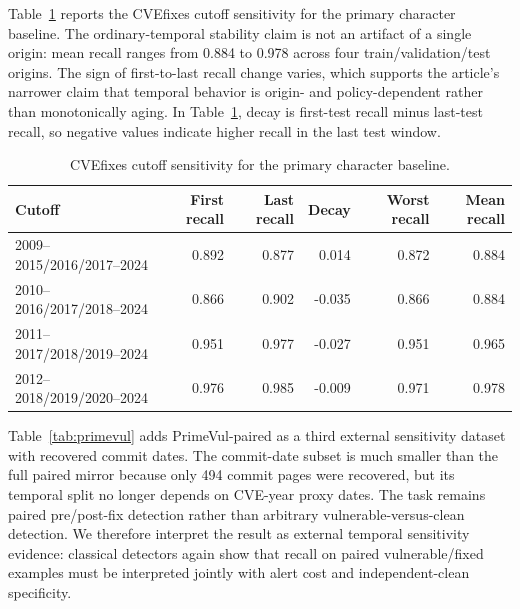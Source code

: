 \documentclass[a4paper,fleqn]{cas-dc}
\begin{document}
Table~\ref{tab:cutoff-sensitivity} reports the CVEfixes cutoff sensitivity for
the primary character baseline. The ordinary-temporal stability claim is not an
artifact of a single origin: mean recall ranges from 0.884 to 0.978 across four
train/validation/test origins. The sign of first-to-last recall change varies,
which supports the article's narrower claim that temporal behavior is origin- and
policy-dependent rather than monotonically aging. In Table~\ref{tab:cutoff-sensitivity},
decay is first-test recall minus last-test recall, so negative values indicate
higher recall in the last test window.

\begin{table}
\centering
\caption{CVEfixes cutoff sensitivity for the primary character baseline.}
\label{tab:cutoff-sensitivity}
\small
\setlength{\tabcolsep}{4pt}
\begin{tabular}{lrrrrr}
\toprule
Cutoff & First recall & Last recall & Decay & Worst recall & Mean recall \\
\midrule
2009--2015/2016/2017--2024 & 0.892 & 0.877 & 0.014 & 0.872 & 0.884 \\
2010--2016/2017/2018--2024 & 0.866 & 0.902 & -0.035 & 0.866 & 0.884 \\
2011--2017/2018/2019--2024 & 0.951 & 0.977 & -0.027 & 0.951 & 0.965 \\
2012--2018/2019/2020--2024 & 0.976 & 0.985 & -0.009 & 0.971 & 0.978 \\
\bottomrule
\end{tabular}
\end{table}

Table~\ref{tab:primevul} adds PrimeVul-paired as a third external sensitivity
dataset with recovered commit dates. The commit-date subset is much smaller
than the full paired mirror because only 494 commit pages were recovered, but
its temporal split no longer depends on CVE-year proxy dates. The task remains
paired pre/post-fix detection rather than arbitrary vulnerable-versus-clean
detection. We therefore interpret the result as external temporal sensitivity
evidence: classical detectors again show that recall on paired
vulnerable/fixed examples must be interpreted jointly with alert cost and
independent-clean specificity.
\end{document}
